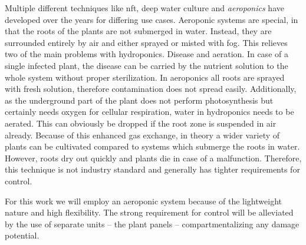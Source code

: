 Multiple different techniques like \ac{nft}, deep water culture and \textit{aeroponics} have developed over the years for differing use cases.
Aeroponic systems are special, in that the roots of the plants are not submerged in water.
Instead, they are surrounded entirely by air and either sprayed or misted with fog.
This relieves two of the main problems with hydroponics.
Disease and aeration.
In case of a single infected plant, the disease can be carried by the nutrient solution to the whole system without proper sterilization.
In aeroponics all roots are sprayed with fresh solution, therefore contamination does not spread easily.
Additionally, as the underground part of the plant does not perform photosynthesis but certainly needs oxygen for cellular respiration, water in hydroponics needs to be aerated.
This can obviously be dropped if the root zone is suspended in air already.
Because of this enhanced gas exchange, in theory a wider variety of plants can be cultivated compared to systems which submerge the roots in water.
However, roots dry out quickly and plants die in case of a malfunction.
Therefore, this technique is not industry standard and generally has tighter requirements for control.

For this work we will employ an aeroponic system because of the lightweight nature and high flexibility.
The strong requirement for control will be alleviated by the use of separate units -- the plant panels -- compartmentalizing any damage potential.




